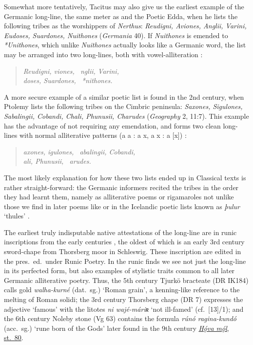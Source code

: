   Somewhat more tentatively, Tacitus may also give us the earliest example of the Germanic long-line, the same meter as  and the Poetic Edda, when he lists the following tribes as the worshippers of \emph{Nerthus}: \emph{Reudigni, Aviones, Anglii, Varini, Eudoses, Suardones, Nuithones} (\emph{Germania} 40).  If \emph{Nuithones} is emended to \emph{*Unithones}, which unlike \emph{Nuithones} actually looks like a Germanic word, the list may be arranged into two long-lines, both with vowel-alliteration \parencites{Malone1934}{Malone1936}:

  \begin{verse}
    \emph{Reudigni, viones, \hld\ nglii, Varini,} \\
    \emph{doses, Suardones, \hld\ *nithones.}
  \end{verse}

  A more secure example of a similar poetic list is found in the 2nd century, when Ptolemy lists the following tribes on the Cimbric peninsula: \emph{Saxones, Sigulones, Sabalingii, Cobandi, Chali, Phunusii, Charudes} (\emph{Geography} 2, 11:7).  This example has the advantage of not requiring any emendation, and forms two clean long-lines with normal alliterative patterns (a a : a x, a x : a [x]) \parencites{Malone1936}[179]{Neidorf2013}:

  \begin{verse}
    \emph{axones, igulones, \hld\ abalingii, Cobandi,} \\
    \emph{ali, Phunusii, \hld\ arudes.}
  \end{verse}

  The most likely explanation for how these two lists ended up in Classical texts is rather straight-forward: the Germanic informers recited the tribes in the order they had learnt them, namely as alliterative poems or rigamaroles not unlike those we find in later poems like  or in the Icelandic poetic lists known as \emph{þulur} ‘thules’ \parencite{Malone1936}.

  The earliest truly indisputable native attestations of the long-line are in runic inscriptions from the early centuries \ce, the oldest of which is an early 3rd century sword-chape from Thorsberg moor in Schleswig.  These inscription are edited in the pres.~ed.~under Runic Poetry.
  In the runic finds we see not just the long-line in its perfected form, but also examples of stylistic traits common to all later Germanic alliterative poetry.  Thus, the 5th century Tjurkö bracteate (DR IK184) calls gold \emph{walha-kurné} (dat.~sg.) ‘Roman grain’, a kenning-like reference to the melting of Roman solidi; the 3rd century Thorsberg chape (DR 7) expresses the adjective ‘famous’ with the litotes \emph{ni wajé-máriʀ} ‘not ill-famed’ (cf.~[13]/1); and the 6th century Noleby stone (Vg 63) contains the formula \emph{rúnó ragina-kundó} (acc.~sg.) ‘rune born of the Gods’ later found in the 9th century \hyperref[Havamal:80]{\emph{Hǫ́va mǫ́l}, st.~80}.


